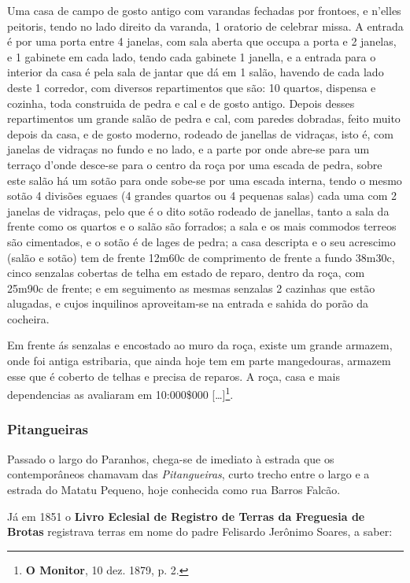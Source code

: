 \begin{citacao}
Uma casa de campo de gosto antigo com varandas fechadas por frontoes, e n'elles peitoris, tendo no lado direito da varanda, 1 oratorio de celebrar missa. A entrada é por uma porta entre 4 janelas, com sala aberta que occupa a porta e 2 janelas, e 1 gabinete em cada lado, tendo cada gabinete 1 janella, e a entrada para o interior da casa é pela sala de jantar que dá em 1 salão, havendo de cada lado deste 1 corredor, com diversos repartimentos que são: 10 quartos, dispensa e cozinha, toda construida de pedra e cal e de gosto antigo. Depois desses repartimentos um grande salão de pedra e cal, com paredes dobradas, feito muito depois da casa, e de gosto moderno, rodeado de janellas de vidraças, isto é, com janelas de vidraças no fundo e no lado, e a parte por onde abre-se para um terraço d'onde desce-se para o centro da roça por uma escada de pedra, sobre este salão há um sotão para onde sobe-se por uma escada interna, tendo o mesmo sotão 4 divisões eguaes (4 grandes quartos ou 4 pequenas salas) cada uma com 2 janelas de vidraças, pelo que é o dito sotão rodeado de janellas, tanto a sala da frente como os quartos e o salão são forrados; a sala e os mais commodos terreos são cimentados, e o sotão é de lages de pedra; a casa descripta e o seu acrescimo (salão e sotão) tem de frente 12m60c de comprimento de frente a fundo 38m30c, cinco senzalas cobertas de telha em estado de reparo, dentro da roça, com 25m90c de frente; e em seguimento as mesmas senzalas 2 cazinhas que estão alugadas, e cujos inquilinos aproveitam-se na entrada e sahida do porão da cocheira.

Em frente ás senzalas e encostado ao muro da roça, existe um grande armazem, onde foi antiga estribaria, que ainda hoje tem em parte mangedouras, armazem esse que é coberto de telhas e precisa de reparos. A roça, casa e mais dependencias as avaliaram em 10:000\$000 [\dots]\footnote{\textbf{O Monitor}, 10 dez. 1879, p. 2.}.
\end{citacao}

\subsubsection{Pitangueiras}\label{subsubsec:pitangueiras}

Passado o largo do Paranhos, chega-se de imediato à estrada que os contemporâneos chamavam das \textit{Pitangueiras}, curto trecho entre o largo e a estrada do Matatu Pequeno, hoje conhecida como rua Barros Falcão. 

Já em 1851 o \textbf{Livro Eclesial de Registro de Terras da Freguesia de Brotas} registrava terras em nome do padre Felisardo Jerônimo Soares, a saber:

